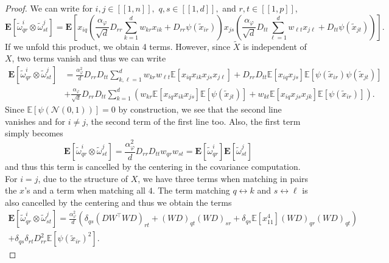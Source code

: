 \documentclass[letterpaper, 10pt, dvipsnames]{article}
\numberwithin{equation}{section}
\renewcommand{\phi}{\varphi}
\newcommand{\wt}{\widetilde}
\newcommand{\E}{\mathds{E}}
\newcommand{\unn}[2]{[\![#1,#2]\!]}
\theoremstyle{definition}
\begin{document}
\begin{proof}
  We can write for $i,j\in\unn{1}{n},$ $q,s\in\unn{1}{d},$ and $r,t\in\unn{1}{p}$, 
  \[
  \mathbf{E}\left[
    \wt{\omega}^i_{qr}\otimes \wt{\omega}^j_{st}
  \right]  
  =
  \mathbf{E}\left[
    x_{iq}\left(
      \frac{\alpha_\phi}{\sqrt{d}}D_{rr}\sum_{k=1}^d w_{kr}x_{ik}+D_{rr}\psi(\wt{x}_{ir})
    \right)
    x_{js}
    \left(
      \frac{\alpha_\phi}{\sqrt{d}}D_{tt}\sum_{\ell=1}^d w_{\ell t}x_{j\ell}+D_{tt}\psi(\wt{x}_{jt})
    \right)
  \right].
  \]
  If we unfold this product, we obtain 4 terms. 
  However, since $\wt{X}$ is independent of $X$, two terms vanish and thus we can write 
  \[
    \begin{aligned}
  \mathbf{E}\left[
    \wt{\omega}^i_{qr}\otimes \wt{\omega}^j_{st}
  \right]
  &=
  \frac{\alpha_\phi^2}{d}D_{rr}D_{tt}
  \sum_{k,\ell=1}^dw_{kr}w_{\ell t}
  \E\left[
    x_{iq}x_{ik}x_{js}x_{j\ell}
  \right]
  +
  D_{rr}D_{tt}\E\left[
    x_{iq}x_{js}
  \right]
  \E\left[
    \psi(\wt{x}_{ir})\psi(\wt{x}_{jt})
  \right] \\
  &+
  \frac{\alpha_\phi}{\sqrt{d}}D_{rr}D_{tt}
  \sum_{k=1}^d
  \left(
  w_{kr} \E[x_{iq}x_{ik}x_{js}]\E[\psi(\wt{x}_{jt})]
  +w_{kt} \E[x_{iq}x_{js}x_{jk}]\E[\psi(\wt{x}_{ir})]
  \right).
    \end{aligned}
  \]
  Since $\E[\psi(\mathcal{N}(0,1))]=0$ by construction, we see that the second line vanishes and for $i\neq j$, the second term of the first line too. Also, the first term simply becomes 
  \[
    \mathbf{E}\left[
      \wt{\omega}^i_{qr}
      \otimes 
      \wt{\omega}^j_{st}
    \right]
    =
    \frac{\alpha_\phi^2}{d}D_{rr}D_{tt}w_{qr}w_{st}
    =
    \mathbf{E}\left[
      \wt{\omega}^i_{qr}
    \right]
    \mathbf{E}\left[
      \wt{\omega}^j_{st}
    \right]
  \]
  and thus this term is cancelled by the centering in the covariance computation. For $i= j$, due to the structure of $X$, we have three terms when matching in pairs the $x$'s and a term when matching all $4$. The term matching $q\leftrightarrow k$ and $s\leftrightarrow \ell$ is also cancelled by the centering and thus we obtain the terms 
  \begin{multline*}
    \mathbf{E}\left[
      \wt{\omega}^i_{qr}
      \otimes 
      \wt{\omega}^j_{st}
    \right]
    =
    \frac{\alpha_\phi^2}{d}\left(
      \delta_{qs}\left(
        DW^\top W D
      \right)_{rt}
      +
      (WD)_{qt}(WD)_{sr}
      +
      \delta_{qs}\E[x_{11}^4](WD)_{qr}(WD)_{qt}
    \right)
    \\+
    \delta_{qs}\delta_{rt}D_{rr}^2
    \E\left[
      \psi(\wt{x}_{ir})^2
    \right].
  \end{multline*}
\end{proof}
\end{document}
